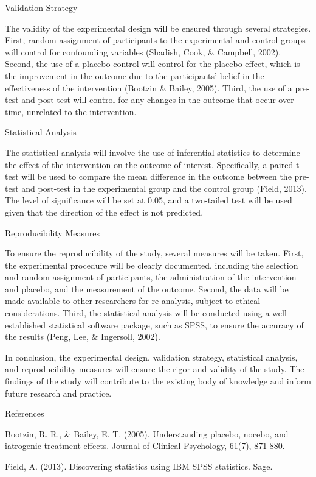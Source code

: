 \documentclass[conference]{IEEEtran}
\begin{document}
Validation Strategy

The validity of the experimental design will be ensured through several strategies. First, random assignment of participants to the experimental and control groups will control for confounding variables (Shadish, Cook, & Campbell, 2002). Second, the use of a placebo control will control for the placebo effect, which is the improvement in the outcome due to the participants' belief in the effectiveness of the intervention (Bootzin & Bailey, 2005). Third, the use of a pre-test and post-test will control for any changes in the outcome that occur over time, unrelated to the intervention.

Statistical Analysis

The statistical analysis will involve the use of inferential statistics to determine the effect of the intervention on the outcome of interest. Specifically, a paired t-test will be used to compare the mean difference in the outcome between the pre-test and post-test in the experimental group and the control group (Field, 2013). The level of significance will be set at 0.05, and a two-tailed test will be used given that the direction of the effect is not predicted.

Reproducibility Measures

To ensure the reproducibility of the study, several measures will be taken. First, the experimental procedure will be clearly documented, including the selection and random assignment of participants, the administration of the intervention and placebo, and the measurement of the outcome. Second, the data will be made available to other researchers for re-analysis, subject to ethical considerations. Third, the statistical analysis will be conducted using a well-established statistical software package, such as SPSS, to ensure the accuracy of the results (Peng, Lee, & Ingersoll, 2002).

In conclusion, the experimental design, validation strategy, statistical analysis, and reproducibility measures will ensure the rigor and validity of the study. The findings of the study will contribute to the existing body of knowledge and inform future research and practice.

References

Bootzin, R. R., & Bailey, E. T. (2005). Understanding placebo, nocebo, and iatrogenic treatment effects. Journal of Clinical Psychology, 61(7), 871-880.

Field, A. (2013). Discovering statistics using IBM SPSS statistics. Sage.
\end{document}

